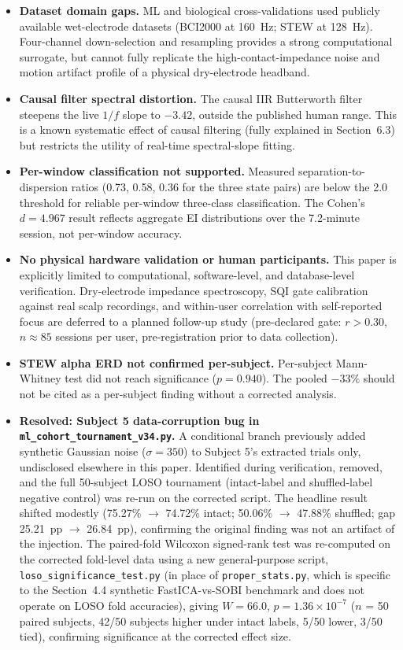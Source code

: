 \documentclass[11pt]{article}
\newcommand{\code}[1]{\texttt{#1}}
\begin{document}
\begin{itemize}[leftmargin=*]
\item \textbf{Dataset domain gaps.} ML and biological cross-validations used publicly available wet-electrode datasets (BCI2000 at 160~Hz; STEW at 128~Hz). Four-channel down-selection and resampling provides a strong computational surrogate, but cannot fully replicate the high-contact-impedance noise and motion artifact profile of a physical dry-electrode headband.
\item \textbf{Causal filter spectral distortion.} The causal IIR Butterworth filter steepens the live $1/f$ slope to $-3.42$, outside the published human range. This is a known systematic effect of causal filtering (fully explained in Section~6.3) but restricts the utility of real-time spectral-slope fitting.
\item \textbf{Per-window classification not supported.} Measured separation-to-dispersion ratios (0.73, 0.58, 0.36 for the three state pairs) are below the 2.0 threshold for reliable per-window three-class classification. The Cohen's $d = 4.967$ result reflects aggregate EI distributions over the 7.2-minute session, not per-window accuracy.
\item \textbf{No physical hardware validation or human participants.} This paper is explicitly limited to computational, software-level, and database-level verification. Dry-electrode impedance spectroscopy, SQI gate calibration against real scalp recordings, and within-user correlation with self-reported focus are deferred to a planned follow-up study (pre-declared gate: $r > 0.30$, $n \approx 85$ sessions per user, pre-registration prior to data collection).
\item \textbf{STEW alpha ERD not confirmed per-subject.} Per-subject Mann-Whitney test did not reach significance ($p = 0.940$). The pooled $-33\%$ should not be cited as a per-subject finding without a corrected analysis.
\item \textbf{Resolved: Subject 5 data-corruption bug in \code{ml\_cohort\_tournament\_v34.py}.} A conditional branch previously added synthetic Gaussian noise ($\sigma = 350$) to Subject 5's extracted trials only, undisclosed elsewhere in this paper. Identified during verification, removed, and the full 50-subject LOSO tournament (intact-label and shuffled-label negative control) was re-run on the corrected script. The headline result shifted modestly (75.27\% $\to$ 74.72\% intact; 50.06\% $\to$ 47.88\% shuffled; gap 25.21~pp $\to$ 26.84~pp), confirming the original finding was not an artifact of the injection. The paired-fold Wilcoxon signed-rank test was re-computed on the corrected fold-level data using a new general-purpose script, \code{loso\_significance\_test.py} (in place of \code{proper\_stats.py}, which is specific to the Section~4.4 synthetic FastICA-vs-SOBI benchmark and does not operate on LOSO fold accuracies), giving $W = 66.0$, $p = 1.36\times10^{-7}$ ($n$ = 50 paired subjects, 42/50 subjects higher under intact labels, 5/50 lower, 3/50 tied), confirming significance at the corrected effect size.

\end{itemize}
\end{document}
